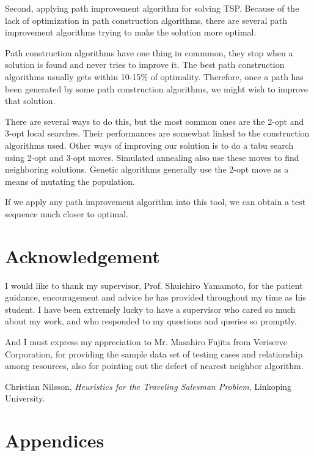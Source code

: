 \documentclass[12pt,a4paper]{article}
\begin{document}
Second, applying path improvement algorithm for solving TSP. Because of the lack of optimization in path construction algorithms, there are several path improvement algorithms trying to make the solution more optimal. 

Path construction algorithms have one thing in commmon, they stop when a solution is found and never tries to improve it. The best path construction algorithms usually gets within 10-15\% of optimality. Therefore, once a path has been generated by some path construction algorithms, we might wish to improve that solution.

There are several ways to do this, but the most common ones are the 2-opt and 3-opt local searches. Their performances are somewhat linked to the construction algorithms used. Other ways of improving our solution is to do a tabu search using 2-opt and 3-opt moves. Simulated annealing also use these moves to find neighboring solutions. Genetic algorithms generally use the 2-opt move as a means of mutating the population.\cite{1}

If we apply any path improvement algorithm into this tool, we can obtain a test sequence much closer to optimal.

\section{Acknowledgement}
I would like to thank my supervisor, Prof. Shuichiro Yamamoto, for the patient guidance, encouragement and advice he has provided throughout my time as his student. I have been extremely lucky to have a supervisor who cared so much about my work, and who responded to my questions and queries so promptly.

And I must express my appreciation to Mr. Masahiro Fujita from Veriserve Corporation, for providing the sample data set of testing cases and relationship among resources, also for pointing out the defect of nearest neighbor algorithm.

\begin{thebibliography}{9}

  Christian Nilsson, 
  \emph{Heuristics for the Traveling Salesman Problem}, 
  Linkoping University.

\end{thebibliography}

\lstset{numbers=left}
\renewcommand{\thesubsection}{\Alph{subsection}}
\section{Appendices}
\end{document}
